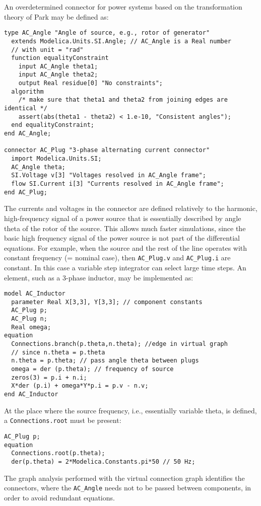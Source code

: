 \begin{nonnormative}
An overdetermined connector for power systems based on the
transformation theory of Park may be defined as:
\begin{lstlisting}[language=modelica]
type AC_Angle "Angle of source, e.g., rotor of generator"
  extends Modelica.Units.SI.Angle; // AC_Angle is a Real number
  // with unit = "rad"
  function equalityConstraint
    input AC_Angle theta1;
    input AC_Angle theta2;
    output Real residue[0] "No constraints";
  algorithm
    /* make sure that theta1 and theta2 from joining edges are identical */
    assert(abs(theta1 - theta2) < 1.e-10, "Consistent angles");
  end equalityConstraint;
end AC_Angle;

connector AC_Plug "3-phase alternating current connector"
  import Modelica.Units.SI;
  AC_Angle theta;
  SI.Voltage v[3] "Voltages resolved in AC_Angle frame";
  flow SI.Current i[3] "Currents resolved in AC_Angle frame";
end AC_Plug;
\end{lstlisting}
The currents and voltages in the connector are defined relatively
to the harmonic, high-frequency signal of a power source that is
essentially described by angle theta of the rotor of the source. This
allows much faster simulations, since the basic high frequency signal of
the power source is not part of the differential equations. For example,
when the source and the rest of the line operates with constant
frequency (= nominal case), then \lstinline!AC_Plug.v! and \lstinline!AC_Plug.i!
are constant. In this case a variable step integrator can select
large time steps. An element, such as a 3-phase inductor, may be
implemented as:
\begin{lstlisting}[language=modelica]
model AC_Inductor
  parameter Real X[3,3], Y[3,3]; // component constants
  AC_Plug p;
  AC_Plug n;
  Real omega;
equation
  Connections.branch(p.theta,n.theta); //edge in virtual graph
  // since n.theta = p.theta
  n.theta = p.theta; // pass angle theta between plugs
  omega = der (p.theta); // frequency of source
  zeros(3) = p.i + n.i;
  X*der (p.i) + omega*Y*p.i = p.v - n.v;
end AC_Inductor
\end{lstlisting}
At the place where the source frequency, i.e., essentially
variable theta, is defined, a \lstinline!Connections.root! must be present:
\begin{lstlisting}[language=modelica]
  AC_Plug p;
equation
  Connections.root(p.theta);
  der(p.theta) = 2*Modelica.Constants.pi*50 // 50 Hz;
\end{lstlisting}
The graph analysis performed with the virtual connection graph
identifies the connectors, where the \lstinline!AC_Angle! needs not to be
passed between components, in order to avoid redundant equations.
\end{nonnormative}

